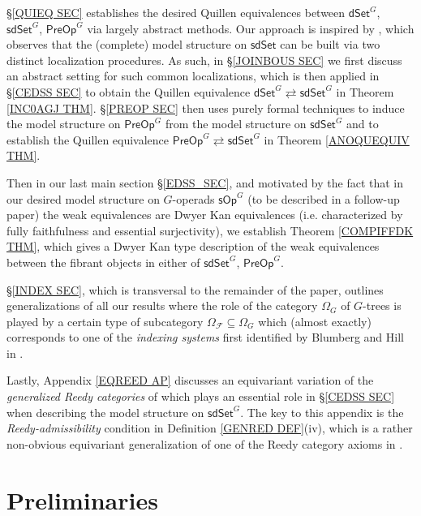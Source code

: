 \documentclass[a4paper,10pt
,draft
]{article}%
\begin{document}
\S \ref{QUIEQ SEC} establishes the desired Quillen equivalences between 
$\mathsf{dSet}^G$, $\mathsf{sdSet}^G$, $\mathsf{PreOp}^G$
via largely abstract methods.
Our approach is inspired by 
\cite[Thm. 6.6]{CM13a}, which observes that the (complete) model structure on $\mathsf{sdSet}$ can be built via two distinct localization procedures.
As such, in \S \ref{JOINBOUS SEC} we first discuss an abstract setting for such common localizations, 
which is then applied in \S \ref{CEDSS SEC} to obtain the Quillen equivalence
$\mathsf{dSet}^G \rightleftarrows \mathsf{sdSet}^G$
in Theorem \ref{INC0AGJ THM}.
\S \ref{PREOP SEC} then uses purely formal techniques to induce the model structure on
$\mathsf{PreOp}^G$ from the model structure on
$\mathsf{sdSet}^G$
and to establish the Quillen equivalence
$\mathsf{PreOp}^G \rightleftarrows \mathsf{sdSet}^G$
in Theorem \ref{ANOQUEQUIV THM}.

Then in our last main section \S \ref{EDSS_SEC},
and motivated by the fact that in our desired model structure on $G$-operads $\mathsf{sOp}^G$
(to be described in a follow-up paper)
the weak equivalences are Dwyer Kan equivalences
(i.e. characterized by fully faithfulness and essential surjectivity), 
we establish Theorem \ref{COMPIFFDK THM}, which gives a Dwyer Kan type description of the weak equivalences 
between the fibrant objects in either of $\mathsf{sdSet}^G$, $\mathsf{PreOp}^G$.

\S \ref{INDEX SEC}, which is transversal to the remainder of the paper, outlines generalizations of all our results where the role of the category $\Omega_G$ of $G$-trees
is played by a certain type of subcategory
$\Omega_{\mathcal{F}} \subseteq \Omega_G$
which (almost exactly) corresponds to one of the 
\textit{indexing systems} first identified
by Blumberg and Hill in \cite{BH15}.

Lastly, Appendix \ref{EQREED AP} discusses an equivariant variation of the \textit{generalized Reedy categories}
of \cite{BM11} which plays an essential role in \S \ref{CEDSS SEC}
when describing the model structure on $\mathsf{sdSet}^G$.
The key to this appendix is the \textit{Reedy-admissibility} condition in 
Definition \ref{GENRED DEF}(iv),
which is a rather non-obvious equivariant generalization of one of the Reedy category axioms in \cite{BM11}.



\section{Preliminaries}\label{PREL SEC}
\end{document}

